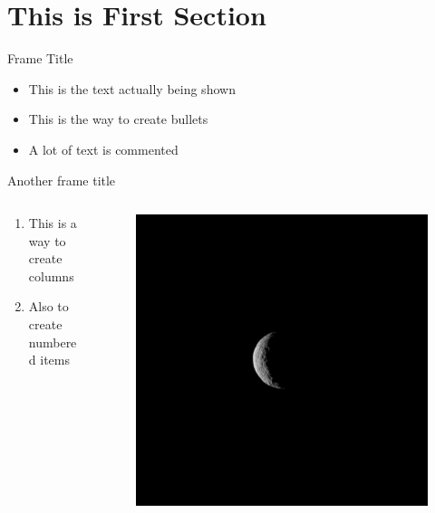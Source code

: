 \section{This is First Section}


\begin{viterbiframe}{{Frame Title}}
\begin{itemize}
\item This is the text actually being shown
\item This is the way to create bullets
\item A lot of text is commented
\end{itemize}
\end{viterbiframe}

\begin{viterbiframe}{Another frame title}

\begin{columns}
\begin{column}{0.7\textwidth}
\begin{enumerate}
\item This is a way to create columns
\item Also to create numbered items
\end{enumerate}
\end{column}
\begin{column}{0.3\textwidth}
\begin{figure}
\centering
\includegraphics[width=0.9\linewidth]{./Ceres_Seen_From_NASA_s_Dawn_Spacecraft.jpg}
\caption{}
\label{fig:overiew_cnn}
\end{figure}
\end{column}
\end{columns}


\end{viterbiframe}

